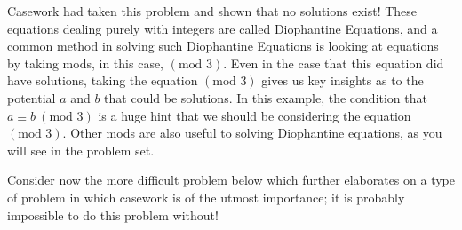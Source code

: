 Casework had taken this problem and shown that no solutions exist! These equations dealing purely with integers are called Diophantine Equations, and a common method in solving such Diophantine Equations is looking at equations by taking mods, in this case, $(\text{mod }3)$. Even in the case that this equation did have solutions, taking the equation $(\text{mod }3)$ gives us key insights as to the potential $a$ and $b$ that could be solutions. In this example, the condition that $a \equiv b ~(\text{mod } 3)$ is a huge hint that we should be considering the equation $(\text{mod } 3)$. Other mods are also useful to solving Diophantine equations, as you will see in the problem set.

Consider now the more difficult problem below which further elaborates on a type of problem in which casework is of the utmost importance; it is probably impossible to do this problem without!


